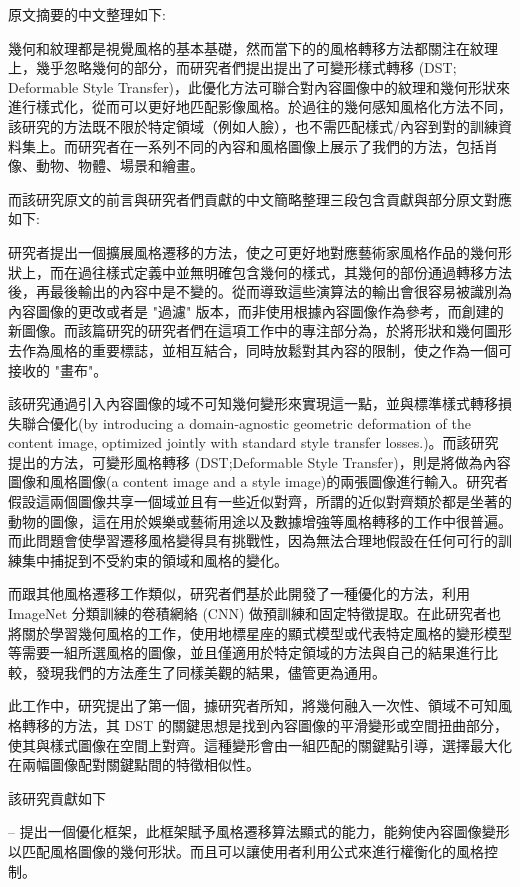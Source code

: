 \documentclass[10pt,UTF8]{ctexart}
\begin{document}
原文摘要的中文整理如下:

幾何和紋理都是視覺風格的基本基礎，然而當下的的風格轉移方法都關注在紋理上，幾乎忽略幾何的部分，而研究者們提出提出了可變形樣式轉移 (DST; Deformable Style Transfer)，此優化方法可聯合對內容圖像中的紋理和幾何形狀來進行樣式化，從而可以更好地匹配影像風格。於過往的幾何感知風格化方法不同，該研究的方法既不限於特定領域（例如人臉），也不需匹配樣式/內容到對的訓練資料集上。而研究者在一系列不同的內容和風格圖像上展示了我們的方法，包括肖像、動物、物體、場景和繪畫。


而該研究原文的前言與研究者們貢獻的中文簡略整理三段包含貢獻與部分原文對應如下:

研究者提出一個擴展風格遷移的方法，使之可更好地對應藝術家風格作品的幾何形狀上，而在過往樣式定義中並無明確包含幾何的樣式，其幾何的部份通過轉移方法後，再最後輸出的內容中是不變的。從而導致這些演算法的輸出會很容易被識別為內容圖像的更改或者是 "過濾" 版本，而非使用根據內容圖像作為參考，而創建的新圖像。而該篇研究的研究者們在這項工作中的專注部分為，於將形狀和幾何圖形去作為風格的重要標誌，並相互結合，同時放鬆對其內容的限制，使之作為一個可接收的 "畫布"。

該研究通過引入內容圖像的域不可知幾何變形來實現這一點，並與標準樣式轉移損失聯合優化(by introducing a domain-agnostic geometric deformation of the content image, optimized jointly with standard style transfer losses.)。而該研究提出的方法，可變形風格轉移 (DST;Deformable Style Transfer)，則是將做為內容圖像和風格圖像(a content image and a style image)的兩張圖像進行輸入。研究者假設這兩個圖像共享一個域並且有一些近似對齊，所謂的近似對齊類於都是坐著的動物的圖像，這在用於娛樂或藝術用途以及數據增強等風格轉移的工作中很普遍。而此問題會使學習遷移風格變得具有挑戰性，因為無法合理地假設在任何可行的訓練集中捕捉到不受約束的領域和風格的變化。

而跟其他風格遷移工作類似，研究者們基於此開發了一種優化的方法，利用 ImageNet 分類訓練的卷積網絡 (CNN) 做預訓練和固定特徵提取。在此研究者也將關於學習幾何風格的工作，使用地標星座的顯式模型或代表特定風格的變形模型等需要一組所選風格的圖像，並且僅適用於特定領域的方法與自己的結果進行比較，發現我們的方法產生了同樣美觀的結果，儘管更為通用。

此工作中，研究提出了第一個，據研究者所知，將幾何融入一次性、領域不可知風格轉移的方法，其 DST 的關鍵思想是找到內容圖像的平滑變形或空間扭曲部分，使其與樣式圖像在空間上對齊。這種變形會由一組匹配的關鍵點引導，選擇最大化在兩幅圖像配對關鍵點間的特徵相似性。

該研究貢獻如下

– 提出一個優化框架，此框架賦予風格遷移算法顯式的能力，能夠使內容圖像變形以匹配風格圖像的幾何形狀。而且可以讓使用者利用公式來進行權衡化的風格控制。
\end{document}
